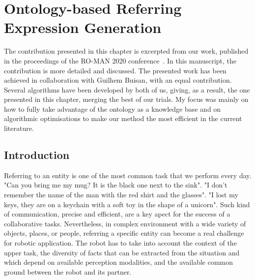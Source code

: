 \ifdefined{}
\else
\setcounter{chapter}{4} %
\dominitoc
\faketableofcontents
\fi

\chapter{Ontology-based Referring Expression Generation}
\label{chap:4}
\minitoc

The contribution presented in this chapter is excerpted from our work, published in the proceedings of the RO-MAN 2020 conference~\cite{buisan_2020_efficient}. In this manuscript, the contribution is more detailed and discussed. The presented work has been achieved in collaboration with Guilhem Buisan, with an equal contribution. Several algorithms have been developed by both of us, giving, as a result, the one presented in this chapter, merging the best of our trials. My focus was mainly on how to fully take advantage of the ontology as a knowledge base and on algorithmic optimisations to make our method the most efficient in the current literature.

\section{Introduction}

Referring to an entity is one of the most common task that we perform every day. "Can you bring me my mug? It is the black one next to the sink". "I don't remember the name of the man with the red shirt and the glasses". "I lost my keys, they are on a keychain with a soft toy in the shape of a unicorn". Such kind of communication, precise and efficient, are a key apect for the success of a collaborative tasks. Nevertheless, in complex environment with a wide variety of objects, places, or people, referring a specific entity can become a real challenge for robotic application. The robot has to take into account the context of the upper task, the diversity of facts that can be extracted from the situation and which depend on available perception modalities, and the available common ground between the robot and its partner. 

